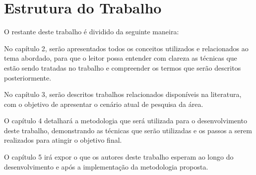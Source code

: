 \section{Estrutura do Trabalho}

O restante deste trabalho é dividido da seguinte maneira: 

No capítulo 2, serão apresentados todos os conceitos utilizados e relacionados ao tema abordado, para que o leitor possa entender com clareza as técnicas que estão sendo tratadas no trabalho e compreender os termos que serão descritos posteriormente.

No capítulo 3, serão descritos trabalhos relacionados disponíveis na literatura, com o objetivo de apresentar o cenário atual de pesquisa da área.
 
O capítulo 4 detalhará a metodologia que será utilizada para o desenvolvimento deste trabalho, demonstrando as técnicas que serão utilizadas e os passos a serem realizados para atingir o objetivo final.

O capítulo 5 irá expor o que os autores deste trabalho esperam ao longo do desenvolvimento e após a implementação da metodologia proposta.